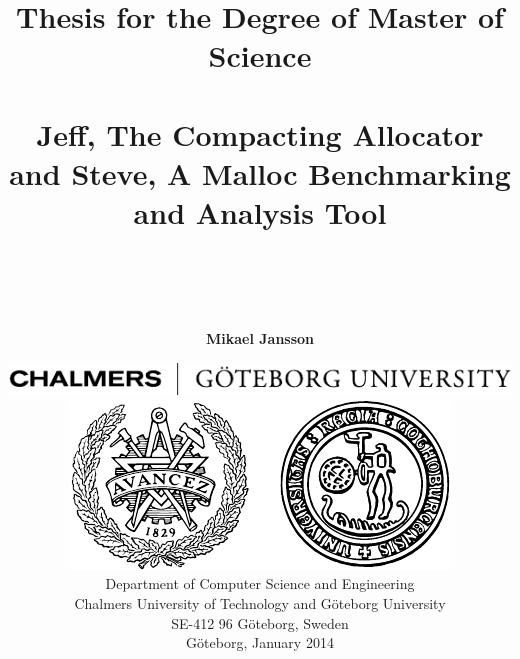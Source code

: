 \begin{titlepage}
\thispagestyle{empty}

\title{{\Large Thesis for the Degree of Master of Science}
     \\ ~
     \\ \bf Jeff, The Compacting Allocator and Steve, A Malloc Benchmarking and Analysis Tool
     \\ ~
     \\ ~
      }

\author{\Large \bf Mikael Jansson}

\date{
  \enlargethispage{2.1\baselineskip}
  \includegraphics{graphics/chalmers/ChalmGUtextsvEng} \\
  \vspace{5mm}
  \includegraphics{graphics/chalmers/ChalmGUmarke} \\
  \vspace{12mm}
  Department of Computer Science and Engineering \\
  Chalmers University of Technology
    and G\"{o}teborg University \\
  SE-412 96 G\"{o}teborg, Sweden \\
  \vspace{12mm}
  G{\"o}teborg, January 2014
}

\end{titlepage}

\maketitle

\newpage{}
\thispagestyle{empty}
\mbox{}

\noindent

